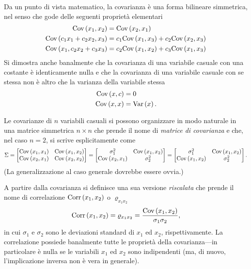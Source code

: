 Da un punto di vista matematico, la covarianza è una forma bilineare
simmetrica, nel senso che gode delle seguenti proprietà elementari
\begin{align}
  \text{Cov}\left(x_1, x_2\right) & = \text{Cov}\left(x_2, x_1\right)\\
  \text{Cov}\left(c_1x_1 + c_2x_2, x_3\right) & = c_1\text{Cov}\left(x_1, x_3\right) + c_2 \text{Cov}\left(x_2, x_3\right)\\
  \text{Cov}\left(x_1, c_2x_2 + c_3x_3\right) & = c_2\text{Cov}\left(x_1, x_2\right) + c_3 \text{Cov}\left(x_1, x_3\right)
\end{align}
Si dimostra anche banalmente che la covarianza di una variabile casuale con
una costante è identicamente nulla e che la covarianza di una variabile
casuale con se stessa non è altro che la varianza della variabile stessa
\begin{align}
  \text{Cov}\left(x, c\right) & = 0 \\
  \text{Cov}\left(x, x\right) & = \text{Var}\left(x\right).
\end{align}

Le covarianze  di $n$ variabili casuali si possono organizzare in
modo naturale in una matrice simmetrica $n \times n$ che prende il nome di
\emph{matrice di covarianza} e che, nel caso $n = 2$, si scrive esplicitamente
come
\begin{align}
  \Sigma =
  \begin{bmatrix}
    \text{Cov}\left(x_1, x_1\right) & \text{Cov}\left(x_1, x_2\right)\\
    \text{Cov}\left(x_2, x_1\right) & \text{Cov}\left(x_2, x_2\right)
  \end{bmatrix} =
  \begin{bmatrix}
    \sigma^2_1 & \text{Cov}\left(x_1, x_2\right)\\
    \text{Cov}\left(x_2, x_1\right) & \sigma^2_2
  \end{bmatrix} =
  \begin{bmatrix}
    \sigma^2_1 & \text{Cov}\left(x_1, x_2\right)\\
    \text{Cov}\left(x_1, x_2\right) & \sigma^2_2
  \end{bmatrix}.
\end{align}
(La generalizzazione al caso generale dovrebbe essere ovvia.)

A partire dalla covarianza si definisce una sua versione \emph{riscalata}
che prende il nome di correlazione $\text{Corr}\left(x_1, x_2\right)$ o $\varrho_{x_1x_2}$
\begin{align}
  \text{Corr}\left(x_1, x_2\right) = \varrho_{x_1x_2} = \frac{\text{Cov}\left(x_1, x_2\right)}{\sigma_1 \sigma_2},
\end{align}
in cui $\sigma_1$ e $\sigma_2$ sono le deviazioni standard di $x_1$ ed $x_2$,
rispettivamente. La correlazione possiede banalmente tutte le proprietà della
covarianza---in particolare è nulla se le variabili $x_1$ ed $x_2$ sono
indipendenti (ma, di nuovo, l'implicazione inversa non è vera in generale).


